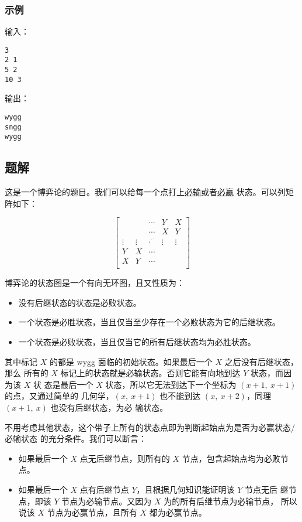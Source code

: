 \subsubsection{示例}
输入：
\begin{lstlisting}
3
2 1
5 2
10 3
\end{lstlisting}

输出：
\begin{lstlisting}
wygg
sngg
wygg
\end{lstlisting}

\subsection{题解}
这是一个博弈论的题目。我们可以给每一个点打上\underline{必输}或者\underline{必赢}
状态。可以列矩阵如下：

\def\rddots{\cdot^{\cdot^{\cdot}}}
$$\begin{bmatrix}
           &        & \cdots  & Y      & X       \\
           &        & \cdots  & X      & Y       \\
    \vdots & \vdots & \rddots & \vdots & \vdots  \\
    Y      & X      & \cdots                     \\
    X      & Y      & \cdots                     \\
\end{bmatrix}$$

博弈论的状态图是一个有向无环图，且又性质为：
\begin{itemize}
    \item 没有后继状态的状态是必败状态。
    \item 一个状态是必胜状态，当且仅当至少存在一个必败状态为它的后继状态。
    \item 一个状态是必败状态，当且仅当它的所有后继状态均为必胜状态。
\end{itemize}

其中标记 $X$ 的都是 wygg 面临的初始状态。如果最后一个 $X$ 之后没有后继状态，那么
所有的 $X$ 标记上的状态就是必输状态。否则它能有向地到达 $Y$ 状态，而因为该 $X$ 状
态是最后一个 $X$ 状态，所以它无法到达下一个坐标为 $(x+1,\ x+1)$ 的点，又通过简单的
几何学，$(x,\ x+1)$ 也不能到达 $(x,\ x+2)$，同理 $(x+1,\ x)$ 也没有后继状态，为必
输状态。

不用考虑其他状态，这个带子上所有的状态点即为判断起始点为是否为必赢状态/必输状态
的充分条件。我们可以断言：
\begin{itemize}
    \item 如果最后一个 $X$ 点无后继节点，则所有的 $X$ 节点，包含起始点均为必败节
        点。
    \item 如果最后一个 $X$ 点有后继节点 $Y$，且根据几何知识能证明该 $Y$ 节点无后
        继节点，即该 $Y$ 节点为必输节点。又因为 $X$ 为的所有后继节点为必输节点，
        所以说该 $X$ 节点为必赢节点，且所有 $X$ 都为必赢节点。
\end{itemize}

